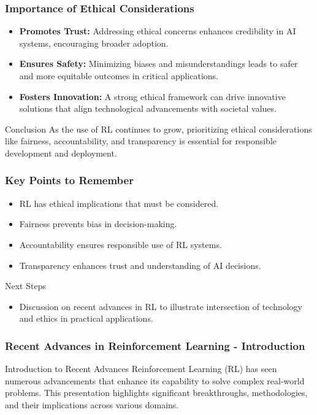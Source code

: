 \documentclass[aspectratio=169]{beamer}
\begin{document}
\begin{frame}[fragile]
    \frametitle{Importance of Ethical Considerations}
    \begin{itemize}
        \item \textbf{Promotes Trust:} Addressing ethical concerns enhances credibility in AI systems, encouraging broader adoption.
        \item \textbf{Ensures Safety:} Minimizing biases and misunderstandings leads to safer and more equitable outcomes in critical applications.
        \item \textbf{Fosters Innovation:} A strong ethical framework can drive innovative solutions that align technological advancements with societal values.
    \end{itemize}
    \begin{block}{Conclusion}
        As the use of RL continues to grow, prioritizing ethical considerations like fairness, accountability, and transparency is essential for responsible development and deployment.
    \end{block}
\end{frame}

\begin{frame}[fragile]
    \frametitle{Key Points to Remember}
    \begin{itemize}
        \item RL has ethical implications that must be considered.
        \item Fairness prevents bias in decision-making.
        \item Accountability ensures responsible use of RL systems.
        \item Transparency enhances trust and understanding of AI decisions.
    \end{itemize}
    \begin{block}{Next Steps}
        \begin{itemize}
            \item Discussion on recent advances in RL to illustrate intersection of technology and ethics in practical applications.
        \end{itemize}
    \end{block}
\end{frame}

\begin{frame}[fragile]
    \frametitle{Recent Advances in Reinforcement Learning - Introduction}
    \begin{block}{Introduction to Recent Advances}
        Reinforcement Learning (RL) has seen numerous advancements that enhance its capability to solve complex real-world problems. This presentation highlights significant breakthroughs, methodologies, and their implications across various domains.
    \end{block}
\end{frame}
\end{document}

